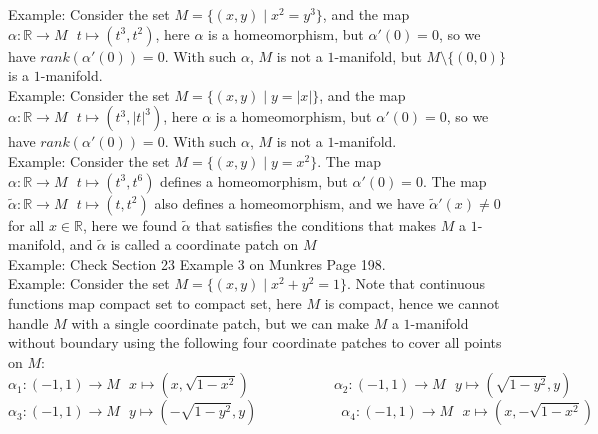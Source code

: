 \documentclass[11pt,oneside]{book}
\theoremstyle{break}
\theoremstyle{break}
\newcommand{\R}{\mathbb{R}}
\newcommand{\example}{\color{green}Example: \color{black}}
\begin{document}
\example Consider the set $M = \{(x,y) \mid x^2 = y^3\}$, and the map $\alpha:\R \to M \ \ \ t \mapsto (t^3,t^2)$, here $\alpha $ is a homeomorphism, but $\alpha'(0) = 0$, so we have $rank(\alpha'(0)) = 0$. With such $\alpha$, $M$ is not a $1$-manifold, but $M \setminus \{(0,0)\}$ is a $1$-manifold. \\

\example Consider the set $M = \{(x,y) \mid y=|x| \}$, and the map $\alpha:\R \to M \ \ \ t\mapsto (t^3, |t|^3)$, here $\alpha$ is a homeomorphism, but $\alpha'(0) = 0$, so we have $rank(\alpha'(0)) = 0$. With such $\alpha$, $M$ is not a $1$-manifold. \\

\example Consider the set $M = \{(x,y) \mid y = x^2\}$. The map $\alpha:\R \to M \ \ \ t\mapsto (t^3,t^6)$ defines a homeomorphism, but $\alpha'(0) = 0$. The map $\widetilde{\alpha}:\R \to M \ \ \ t\mapsto (t,t^2)$ also defines a homeomorphism, and we have $\widetilde{\alpha}'(x) \neq 0$ for all $x \in \R$, here we found $\widetilde{\alpha}$ that satisfies the conditions that makes $M$ a $1$-manifold, and $\widetilde{\alpha}$ is called a coordinate patch on $M$\\

\example Check Section 23 Example 3 on Munkres Page 198.\\

\example Consider the set $M = \{(x,y) \mid x^2+y^2 = 1\}$. Note that continuous functions map compact set to compact set, here $M$ is compact, hence we cannot handle $M$ with a single coordinate patch, but we can make $M$ a $1$-manifold without boundary using the following four coordinate patches to cover all points on $M$:
$$\alpha_1: (-1,1) \to M \ \ \  x\mapsto \left(x,\sqrt{1-x^2}\right) \qquad\qquad\qquad\alpha_2: (-1,1) \to M \ \ \  y\mapsto \left(\sqrt{1-y^2},y\right) $$
$$\alpha_3: (-1,1) \to M \ \ \  y\mapsto \left(-\sqrt{1-y^2},y\right)\qquad\qquad\qquad\alpha_4: (-1,1) \to M \ \ \  x\mapsto \left(x,-\sqrt{1-x^2}\right)$$
\end{document}
